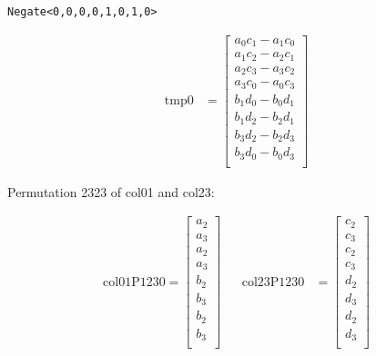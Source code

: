 \documentclass[]{scrartcl}
\begin{document}
\texttt{Negate<0,0,0,0,1,0,1,0>} 

\begin{align*}
\mathrm{tmp0} 
&=
\begin{bmatrix}
a_0c_1 - a_1c_0\\
a_1c_2 - a_2c_1\\
a_2c_3 - a_3c_2\\
a_3c_0 - a_0c_3\\
b_1d_0 - b_0d_1\\
b_1d_2 - b_2d_1\\
b_3d_2 - b_2d_3\\
b_3d_0 - b_0d_3\\
\end{bmatrix}
\end{align*}



Permutation 2323 of col01 and col23:

\begin{align*}
\mathrm{col01P1230} 
=
\begin{bmatrix}
a_2\\
a_3\\
a_2\\
a_3\\
b_2\\
b_3\\
b_2\\
b_3\\
\end{bmatrix}
&&
\mathrm{col23P1230} 
&=
\begin{bmatrix}
c_2\\
c_3\\
c_2\\
c_3\\
d_2\\
d_3\\
d_2\\
d_3\\
\end{bmatrix}
\end{align*}
\end{document}
